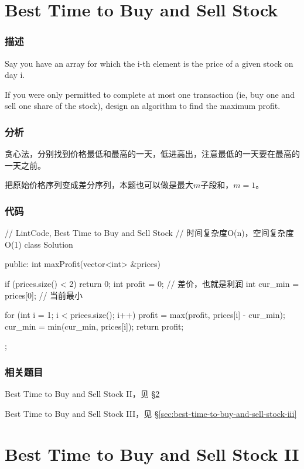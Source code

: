 \section{Best Time to Buy and Sell Stock} %
\label{sec:best-time-to-buy-and-sell-stock}


\subsubsection{描述}
Say you have an array for which the i-th element is the price of a given stock on day i.

If you were only permitted to complete at    most one transaction (ie, buy one and sell one share of the stock), design an algorithm to find the maximum profit.


\subsubsection{分析}
贪心法，分别找到价格最低和最高的一天，低进高出，注意最低的一天要在最高的一天之前。

把原始价格序列变成差分序列，本题也可以做是最大$m$子段和，$m=1$。

\subsubsection{代码}
\begin{Code}
// LintCode, Best Time to Buy and Sell Stock
// 时间复杂度O(n)，空间复杂度O(1)
class Solution {
public:
    int maxProfit(vector<int> &prices) {
        if (prices.size() < 2) return 0;
        int profit = 0;  // 差价，也就是利润
        int cur_min = prices[0]; // 当前最小

        for (int i = 1; i < prices.size(); i++) {
            profit = max(profit, prices[i] - cur_min);
            cur_min = min(cur_min, prices[i]);
        }
        return profit;
    }
};
\end{Code}


\subsubsection{相关题目}
\begindot
\item Best Time to Buy and Sell Stock II，见 \S \ref{sec:best-time-to-buy-and-sell-stock-ii}
\item Best Time to Buy and Sell Stock III，见 \S \ref{sec:best-time-to-buy-and-sell-stock-iii}
\myenddot


\section{Best Time to Buy and Sell Stock II} %
\label{sec:best-time-to-buy-and-sell-stock-ii}


